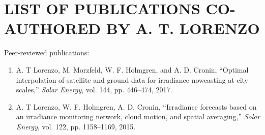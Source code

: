 \chapter{LIST OF PUBLICATIONS CO-AUTHORED BY A. T. LORENZO}
Peer-reviewed publications:
\begin{enumerate}
\item A. T Lorenzo, M. Morzfeld, W. F. Holmgren, and A. D. Cronin,
  ``Optimal interpolation of satellite and ground data for
    irradiance nowcasting at city scales,'' \emph{Solar Energy},
    vol. 144, pp. 446--474, 2017.

\item A. T Lorenzo, W. F. Holmgren, A. D. Cronin, ``Irradiance
  forecasts based on an irradiance monitoring network, cloud motion,
  and spatial averaging,'' \emph{Solar Energy}, vol. 122,
  pp. 1158--1169, 2015.

\end{enumerate}

